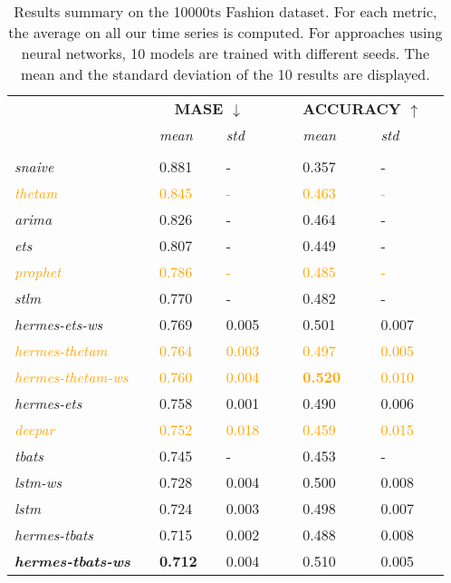\documentclass[10pt]{article} %
\begin{document}
\begin{table}
  \caption{Results summary on the 10000ts Fashion dataset. For each metric, the average on all our time series is computed. For approaches using neural networks, 10 models are trained with different seeds. The mean and the standard deviation of the 10 results are displayed.}
  \centering
  \begin{tabular}{l||lllll|lllll}
   &&\multicolumn{3}{c}{\textbf{MASE $\downarrow$}} &&& \multicolumn{3}{c}{\textbf{ACCURACY $\uparrow$}}&\\
    &&  \textit{mean}  && \textit{std} &&&  \textit{mean}  && \textit{std}& \\
	 \hline
	 &&&&&&&&&&\\
     \textit{snaive} && 0.881 && - &&& 0.357 && - &\\
     \textcolor{orange}{\textit{thetam}} && \textcolor{orange}{0.845} && \textcolor{orange}{-} &&& \textcolor{orange}{0.463} && \textcolor{orange}{-}\\
     \textit{arima} && 0.826 && -&&& 0.464 && - & \\
     \textit{ets} && 0.807 && -&&& 0.449 && - & \\
     \textcolor{orange}{\textit{prophet}} && \textcolor{orange}{0.786} && \textcolor{orange}{-} &&& \textcolor{orange}{0.485} && \textcolor{orange}{-}\\
     \textit{stlm} && 0.770 && -&&& 0.482 && - & \\
     \textit{hermes-ets-ws} && 0.769 && 0.005 &&& 0.501 && 0.007 &\\
     \textcolor{orange}{\textit{hermes-thetam}} && \textcolor{orange}{0.764} && \textcolor{orange}{0.003} &&& \textcolor{orange}{0.497} && \textcolor{orange}{0.005}\\
     \textcolor{orange}{\textit{hermes-thetam-ws}} && \textcolor{orange}{0.760} && \textcolor{orange}{0.004} &&& \textcolor{orange}{\textbf{0.520}} && \textcolor{orange}{0.010}\\
     \textit{hermes-ets} && 0.758 && 0.001 &&& 0.490 && 0.006 &\\
     \textcolor{orange}{\textit{deepar}} && \textcolor{orange}{0.752} && \textcolor{orange}{0.018} &&& \textcolor{orange}{0.459} && \textcolor{orange}{0.015}\\
     \textit{tbats} && 0.745 && -&&& 0.453 && - & \\
     \textit{lstm-ws} && 0.728 && 0.004 &&& 0.500 && 0.008 &\\
     \textit{lstm} && 0.724 && 0.003 &&& 0.498 && 0.007 &\\
     \textit{hermes-tbats} && 0.715 && 0.002 &&& 0.488 && 0.008 &\\
     \textbf{\textit{hermes-tbats-ws}} && \textbf{0.712} && 0.004 &&& 0.510 && 0.005 &\\
  \end{tabular}
\label{tab:metricresults}
\end{table}
\end{document}
